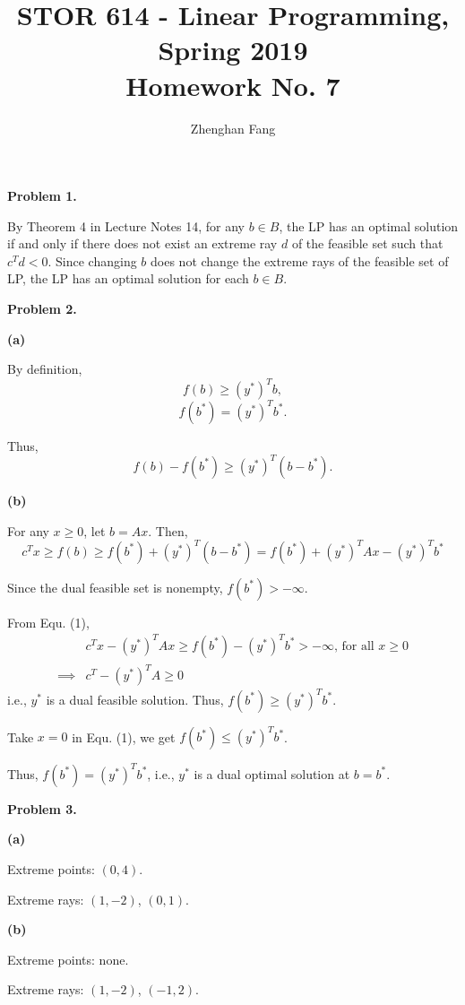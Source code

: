 \documentclass[12pt]{article}
\def\name{Zhenghan Fang}
\begin{document}
 


\title{STOR 614 - Linear Programming, Spring 2019 \\
Homework No. 7}
\author{\name}

\maketitle

\noindent
\textbf{Problem 1.}

By Theorem 4 in Lecture Notes 14, for any $b\in B$, the LP has an optimal solution if and only if there does not exist an extreme ray $d$ of the feasible set such that $c^Td<0$. Since changing $b$ does not change the extreme rays of the feasible set of LP, the LP has an optimal solution for each $b \in B$.

\noindent
\textbf{Problem 2.}

\noindent
\textbf{(a)}

By definition, \[f(b) \ge (y^{*})^Tb,\] \[f(b^*) = (y^{*})^Tb^*.\] 

Thus, \[f(b) - f(b^*) \ge (y^{*})^T(b-b^*).\]

\noindent
\textbf{(b)}

For any $x\ge0$, let $b=Ax$. Then,
\[c^Tx \ge f(b) \ge f(b^*) + (y^{*})^T(b-b^*) = f(b^*) + (y^{*})^TAx - (y^{*})^Tb^* \tag{1} \]

Since the dual feasible set is nonempty, $f(b^*) > -\infty$.

From Equ. (1), 
\begin{align*}
    & c^Tx - (y^{*})^TAx \ge f(b^*) - (y^{*})^Tb^* > -\infty \text{, for all~} x \ge 0 \\ 
    \implies & c^T - (y^{*})^TA \ge 0 
\end{align*}
i.e., $y^{*}$ is a dual feasible solution. Thus, $f(b^*) \ge (y^{*})^Tb^*$.

Take $x=0$ in Equ. (1), we get $f(b^*) \le (y^{*})^Tb^*$.

Thus, $f(b^*) = (y^{*})^Tb^*$, i.e., $y^*$ is a dual optimal solution
at $b=b^*$.

\noindent
\textbf{Problem 3.}

\noindent
\textbf{(a)}

Extreme points: $(0,4)$.

Extreme rays: $(1,-2)$, $(0,1)$.

\noindent
\textbf{(b)}

Extreme points: none.

Extreme rays: $(1,-2)$, $(-1,2)$.


\end{document}
